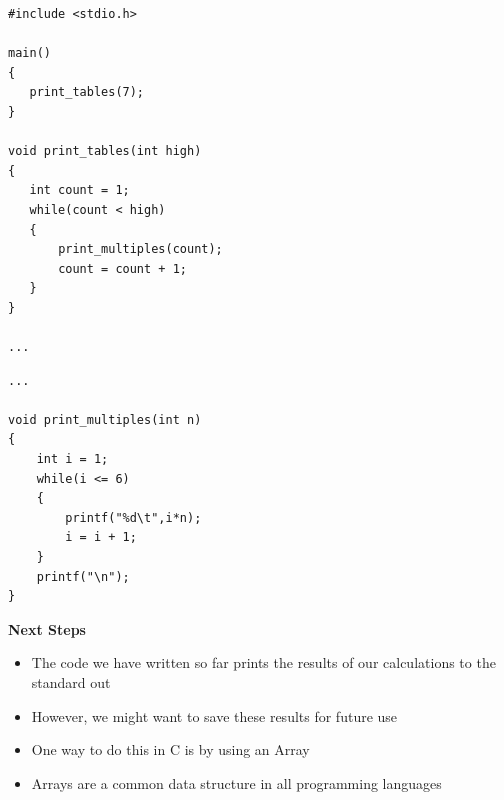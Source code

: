 \documentclass{beamer}
\begin{document}
\begin{frame}[fragile]
\begin{block}{}
\begin{lstlisting}
#include <stdio.h>

main() 
{
   print_tables(7); 
}

void print_tables(int high)
{
   int count = 1;
   while(count < high)
   {
       print_multiples(count);
       count = count + 1;
   } 
}

...
\end{lstlisting}
\end{block}
\end{frame}

\begin{frame}[fragile]
\begin{block}{}
\begin{lstlisting}
... 

void print_multiples(int n)
{
    int i = 1;
    while(i <= 6)
    {
        printf("%d\t",i*n);
        i = i + 1;
    }
    printf("\n");
}
\end{lstlisting}
\end{block}
\end{frame}

 
\begin{frame} 
\begin{center}
\textbf{Next Steps}
\end{center}
\begin{itemize}
\item The code we have written so far prints the results of our calculations to the standard out
\item However, we might want to save these results for future use
\item One way to do this in C is by using an Array 
\item Arrays are a common data structure in all programming languages
\end{itemize}
 \end{frame}
 
\end{document}
